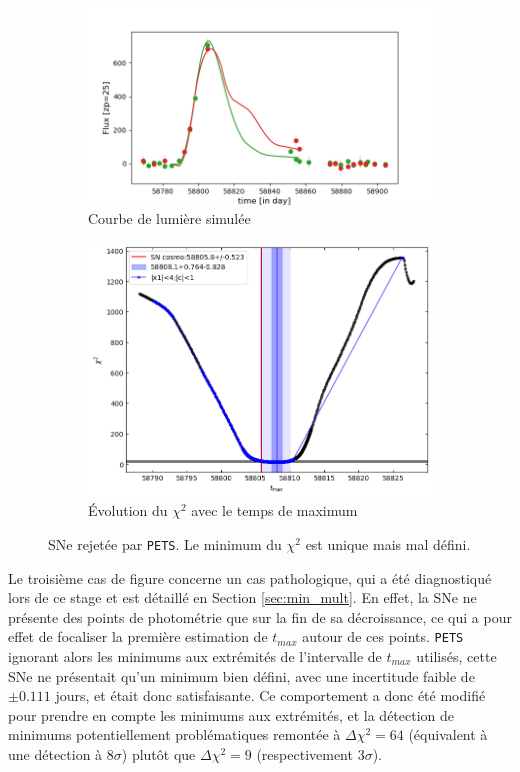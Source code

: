 \documentclass{book}
\def\pets{\texttt{PETS}\xspace}
\begin{document}
\begin{figure}
	\begin{subfigure}{0.45\textwidth}
		\centering
		\includegraphics[width=\textwidth]{figures/10_lc_truth.png}
		\caption{Courbe de lumière simulée}
	\end{subfigure}
	\hfill
	\begin{subfigure}{0.45\textwidth}
		\centering
		\includegraphics[width=\textwidth]{figures/10_Tmaxgrid.png}
		\caption{Évolution du $\chi^2$ avec le temps de maximum}
	\end{subfigure}
	\caption{SNe rejetée par \pets. Le minimum du $\chi^2$ est unique mais mal défini.}
	\label{fig:pets_bad}
\end{figure}

Le troisième cas de figure concerne un cas pathologique, qui a été diagnostiqué lors de ce stage et est détaillé en Section \ref{sec:min_mult}. En effet, la SNe ne présente des points de photométrie que sur la fin de sa décroissance, ce qui a pour effet de focaliser la première estimation de $t_{max}$ autour de ces points. \pets ignorant alors les minimums aux extrémités de l'intervalle de $t_{max}$ utilisés, cette SNe ne présentait qu'un minimum bien défini, avec une incertitude faible de $\pm 0.111$ jours, et était donc satisfaisante. Ce comportement a donc été modifié pour prendre en compte les minimums aux extrémités, et la détection de minimums potentiellement problématiques remontée à $\Delta \chi^2 = 64$ (équivalent à une détection à $8\sigma$) plutôt que $\Delta \chi^2 = 9$ (respectivement $3\sigma$).
\end{document}
